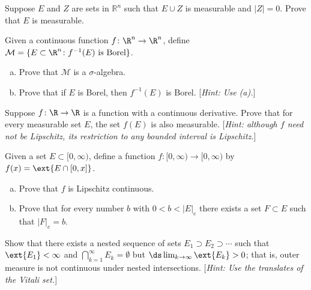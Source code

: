 \begin{hw} \label{hw:7}
Suppose $E$ and $Z$ are sets in $\mathbb R^n$ such that $E\cup Z$ is measurable and $|Z|=0$. Prove that $E$ is measurable. \\
\end{hw}


\begin{hw} \label{hw:8}
Given a continuous function $f \colon \R^n \to \R^n$, define $\mathcal{M}= \{ E \subset \R^n \colon f^{-1}(E) \text{ is Borel} \}$. 
	\begin{enumerate}[(a)]
	\item Prove that $\mathcal{M}$ is a $\sigma$-algebra.
	\item Prove that if $E$ is Borel, then $f^{-1}(E)$ is Borel. [\emph{Hint: Use (a).}] \\
	\end{enumerate}
\end{hw}


\begin{hw} \label{hw:9}
Suppose $f \colon \R \to \R$ is a function with a continuous derivative. Prove that for every measurable set $E$, the set $f(E)$ is also measurable. [\emph{Hint: although $f$ need not be Lipschitz, its restriction to any bounded interval is Lipschitz.}] \\
\end{hw}


\begin{hw} \label{hw:10}
Given a set $E \subset [0, \infty)$, define a function $f: [0, \infty) \to [0, \infty)$ by $f(x)= \ext{E\cap [0, x]}$. 
	\begin{enumerate}[(a)]
	\item Prove that $f$ is Lipschitz continuous.
	\item Prove that for every number $b$ with $0<b<|E|_e$ there exists a set $F \subset E$ such that $|F|_e=b$. \\
	\end{enumerate}
\end{hw}


\begin{hw} \label{hw:11}
Show that there exists a nested sequence of sets $E_1 \supset E_2 \supset \cdots$ such that 
$\ext{E_1}< \infty$ and $\bigcap_{k=1}^\infty E_k= \emptyset$ but $\ds\lim_{k \to \infty } \ext{E_k}> 0$; that is, outer measure is not continuous under nested intersections. [\emph{Hint: Use the translates of the Vitali set.}] \\
\end{hw}


